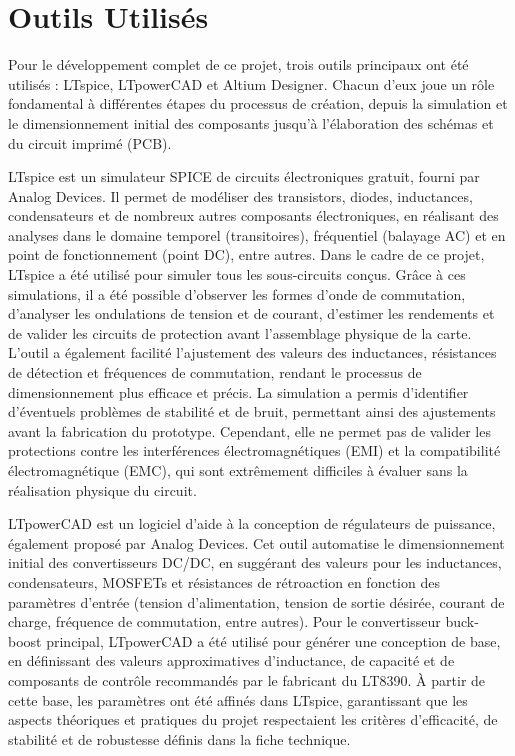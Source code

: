 \section{Outils Utilisés}

Pour le développement complet de ce projet, trois outils principaux ont été utilisés : LTspice, LTpowerCAD et Altium Designer. Chacun d'eux joue un rôle fondamental à différentes étapes du processus de création, depuis la simulation et le dimensionnement initial des composants jusqu'à l'élaboration des schémas et du circuit imprimé (PCB).

LTspice est un simulateur SPICE de circuits électroniques gratuit, fourni par Analog Devices. Il permet de modéliser des transistors, diodes, inductances, condensateurs et de nombreux autres composants électroniques, en réalisant des analyses dans le domaine temporel (transitoires), fréquentiel (balayage AC) et en point de fonctionnement (point DC), entre autres. Dans le cadre de ce projet, LTspice a été utilisé pour simuler tous les sous-circuits conçus. Grâce à ces simulations, il a été possible d'observer les formes d'onde de commutation, d'analyser les ondulations de tension et de courant, d'estimer les rendements et de valider les circuits de protection avant l'assemblage physique de la carte. L'outil a également facilité l'ajustement des valeurs des inductances, résistances de détection et fréquences de commutation, rendant le processus de dimensionnement plus efficace et précis. La simulation a permis d'identifier d'éventuels problèmes de stabilité et de bruit, permettant ainsi des ajustements avant la fabrication du prototype. Cependant, elle ne permet pas de valider les protections contre les interférences électromagnétiques (EMI) et la compatibilité électromagnétique (EMC), qui sont extrêmement difficiles à évaluer sans la réalisation physique du circuit.

LTpowerCAD est un logiciel d'aide à la conception de régulateurs de puissance, également proposé par Analog Devices. Cet outil automatise le dimensionnement initial des convertisseurs DC/DC, en suggérant des valeurs pour les inductances, condensateurs, MOSFETs et résistances de rétroaction en fonction des paramètres d'entrée (tension d'alimentation, tension de sortie désirée, courant de charge, fréquence de commutation, entre autres). Pour le convertisseur buck-boost principal, LTpowerCAD a été utilisé pour générer une conception de base, en définissant des valeurs approximatives d'inductance, de capacité et de composants de contrôle recommandés par le fabricant du LT8390. À partir de cette base, les paramètres ont été affinés dans LTspice, garantissant que les aspects théoriques et pratiques du projet respectaient les critères d'efficacité, de stabilité et de robustesse définis dans la fiche technique.


